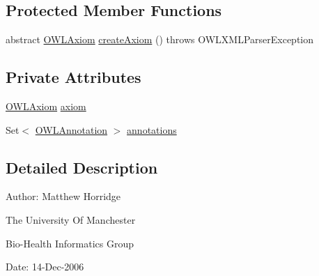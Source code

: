 \subsection*{Protected Member Functions}
\begin{DoxyCompactItemize}
\item 
abstract \hyperlink{interfaceorg_1_1semanticweb_1_1owlapi_1_1model_1_1_o_w_l_axiom}{O\-W\-L\-Axiom} \hyperlink{classorg_1_1coode_1_1owlapi_1_1owlxmlparser_1_1_abstract_o_w_l_axiom_element_handler_a9e13a21c220eff0a440dda96864b7c1e}{create\-Axiom} ()  throws O\-W\-L\-X\-M\-L\-Parser\-Exception
\end{DoxyCompactItemize}
\subsection*{Private Attributes}
\begin{DoxyCompactItemize}
\item 
\hyperlink{interfaceorg_1_1semanticweb_1_1owlapi_1_1model_1_1_o_w_l_axiom}{O\-W\-L\-Axiom} \hyperlink{classorg_1_1coode_1_1owlapi_1_1owlxmlparser_1_1_abstract_o_w_l_axiom_element_handler_a170205bcdb1542a110951507e6047b4a}{axiom}
\item 
Set$<$ \hyperlink{interfaceorg_1_1semanticweb_1_1owlapi_1_1model_1_1_o_w_l_annotation}{O\-W\-L\-Annotation} $>$ \hyperlink{classorg_1_1coode_1_1owlapi_1_1owlxmlparser_1_1_abstract_o_w_l_axiom_element_handler_a5573d5c3badd4182bd19c791420aea02}{annotations}
\end{DoxyCompactItemize}


\subsection{Detailed Description}
Author\-: Matthew Horridge\par
 The University Of Manchester\par
 Bio-\/\-Health Informatics Group\par
 Date\-: 14-\/\-Dec-\/2006\par
\par
 

